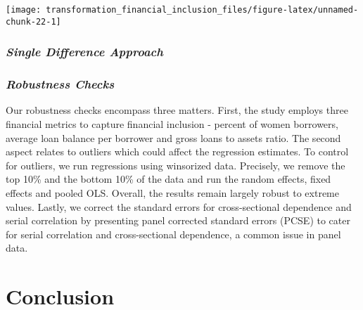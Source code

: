 \documentclass[
]{article}
\newcommand{\blandscape}{\begin{landscape}}
\newcommand{\elandscape}{\end{landscape}}
\begin{document}
\newpage

\newpage
\blandscape

\begin{center}\texttt{[image: transformation\_financial\_inclusion\_files/figure-latex/unnamed-chunk-22-1]} \end{center}

\elandscape
\newpage

\newpage

\hypertarget{single-difference-approach}{%
\subsubsection{\texorpdfstring{\textbf{\emph{Single Difference
Approach}}}{Single Difference Approach}}\label{single-difference-approach}}

\hypertarget{robustness-checks}{%
\subsubsection{\texorpdfstring{\textbf{\emph{Robustness
Checks}}}{Robustness Checks}}\label{robustness-checks}}

Our robustness checks encompass three matters. First, the study employs
three financial metrics to capture financial inclusion - percent of
women borrowers, average loan balance per borrower and gross loans to
assets ratio. The second aspect relates to outliers which could affect
the regression estimates. To control for outliers, we run regressions
using winsorized data. Precisely, we remove the top 10\% and the bottom
10\% of the data and run the random effects, fixed effects and pooled
OLS. Overall, the results remain largely robust to extreme values.
Lastly, we correct the standard errors for cross-sectional dependence
and serial correlation by presenting panel corrected standard errors
(PCSE) to cater for serial correlation and cross-sectional dependence, a
common issue in panel data.

\hypertarget{conclusion}{%
\section{\texorpdfstring{\textbf{Conclusion}}{Conclusion}}\label{conclusion}}
\end{document}

